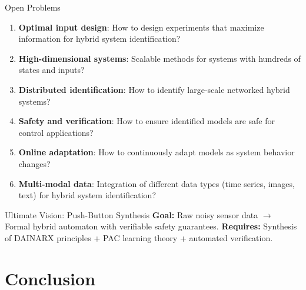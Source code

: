 \documentclass[aspectratio=169]{beamer}
\begin{document}
\begin{frame}{Open Problems}
\begin{enumerate}
\item \textbf{Optimal input design}: How to design experiments that maximize information for hybrid system identification?

\item \textbf{High-dimensional systems}: Scalable methods for systems with hundreds of states and inputs?

\item \textbf{Distributed identification}: How to identify large-scale networked hybrid systems?

\item \textbf{Safety and verification}: How to ensure identified models are safe for control applications?

\item \textbf{Online adaptation}: How to continuously adapt models as system behavior changes?

\item \textbf{Multi-modal data}: Integration of different data types (time series, images, text) for hybrid system identification?
\end{enumerate}

\begin{alertblock}{Ultimate Vision: Push-Button Synthesis}
\textbf{Goal:} Raw noisy sensor data $\rightarrow$ Formal hybrid automaton with verifiable safety guarantees. \textbf{Requires:} Synthesis of DAINARX principles + PAC learning theory + automated verification.
\end{alertblock}
\end{frame}

\section{Conclusion}
\end{document}
